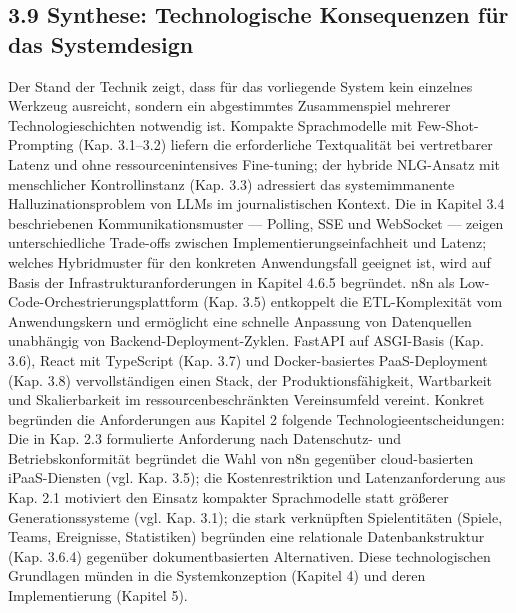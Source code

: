 \subsection{3.9 Synthese: Technologische Konsequenzen für das
Systemdesign}\label{synthese-technologische-konsequenzen-fuxfcr-das-systemdesign}

Der Stand der Technik zeigt, dass für das vorliegende System kein
einzelnes Werkzeug ausreicht, sondern ein abgestimmtes Zusammenspiel
mehrerer Technologieschichten notwendig ist. Kompakte Sprachmodelle mit
Few-Shot-Prompting (Kap. 3.1--3.2) liefern die erforderliche
Textqualität bei vertretbarer Latenz und ohne ressourcenintensives
Fine-tuning; der hybride NLG-Ansatz mit menschlicher Kontrollinstanz
(Kap. 3.3) adressiert das systemimmanente Halluzinationsproblem von LLMs
im journalistischen Kontext. Die in Kapitel 3.4 beschriebenen
Kommunikationsmuster --- Polling, SSE und WebSocket --- zeigen
unterschiedliche Trade-offs zwischen Implementierungseinfachheit und
Latenz; welches Hybridmuster für den konkreten Anwendungsfall geeignet
ist, wird auf Basis der Infrastrukturanforderungen in Kapitel 4.6.5
begründet. n8n als Low-Code-Orchestrierungsplattform (Kap. 3.5)
entkoppelt die ETL-Komplexität vom Anwendungskern und ermöglicht eine
schnelle Anpassung von Datenquellen unabhängig von
Backend-Deployment-Zyklen. FastAPI auf ASGI-Basis (Kap. 3.6), React mit
TypeScript (Kap. 3.7) und Docker-basiertes PaaS-Deployment (Kap. 3.8)
vervollständigen einen Stack, der Produktionsfähigkeit, Wartbarkeit und
Skalierbarkeit im ressourcenbeschränkten Vereinsumfeld vereint. Konkret
begründen die Anforderungen aus Kapitel 2 folgende
Technologieentscheidungen: Die in Kap. 2.3 formulierte Anforderung nach
Datenschutz- und Betriebskonformität begründet die Wahl von n8n
gegenüber cloud-basierten iPaaS-Diensten (vgl. Kap. 3.5); die
Kostenrestriktion und Latenzanforderung aus Kap. 2.1 motiviert den
Einsatz kompakter Sprachmodelle statt größerer Generationssysteme (vgl.
Kap. 3.1); die stark verknüpften Spielentitäten (Spiele, Teams,
Ereignisse, Statistiken) begründen eine relationale Datenbankstruktur
(Kap. 3.6.4) gegenüber dokumentbasierten Alternativen. Diese
technologischen Grundlagen münden in die Systemkonzeption (Kapitel 4)
und deren Implementierung (Kapitel 5).
